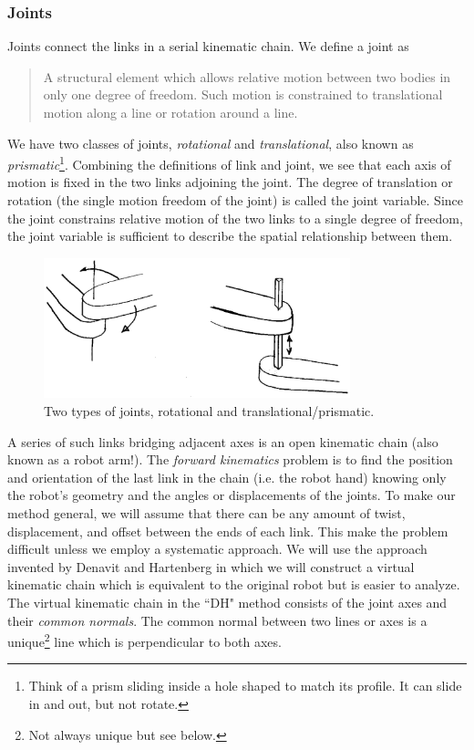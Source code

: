 \subsubsection{Joints}

Joints connect the links in a serial kinematic chain.  We define a joint as
\begin{quotation}
A structural element which allows relative motion between two bodies in only one degree of freedom.  Such motion is constrained to translational motion along a line or rotation around a line.
\end{quotation}

We have two classes of joints, {\it rotational} and {\it translational}, also known as {\it prismatic}\footnote
{Think of a prism sliding inside a hole shaped to match its profile.  It can slide in and out, but not rotate.}.   Combining the definitions of link and joint, we see that each axis of motion is fixed in the two links adjoining the joint.   The degree of translation or rotation (the single motion freedom of the joint) is called the joint variable.    Since the joint constrains relative motion of the two links to a single degree of freedom, the joint variable is sufficient to describe the spatial relationship between them.


\begin{figure}\centering
\includegraphics[width=3.5in]{figs03/00341.eps}
\caption{Two types of joints, rotational and translational/prismatic.}\label{RotationalTranslationalJoints}
\end{figure}


A series of such links bridging adjacent axes is an open kinematic chain (also known as a robot arm!).
The {\it forward kinematics} problem is to find the position and orientation of the last link in the chain (i.e. the robot hand) knowing only the robot's geometry and the angles or displacements of the joints. To make our method general, we will assume that there can be any amount of twist, displacement, and offset between the ends of each link. This make the problem difficult unless we employ a systematic approach.  We will use the approach invented by Denavit and Hartenberg in which we will construct a virtual kinematic chain which is equivalent to the original robot but is easier to analyze.  The virtual kinematic chain in the ``DH" method consists of the joint axes and their {\it common normals}.   The common normal between two lines or axes is a unique\footnote{Not always unique but see below.} line which is perpendicular to both axes.




